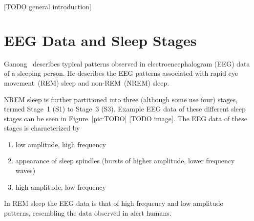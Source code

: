[TODO general introduction]


\section{EEG Data and Sleep Stages}
\label{sec:eeg_data_and_sleep_stages}

Ganong~\cite{Ganong1997} describes typical patterns observed in electroencephalogram (EEG) data of a sleeping person. He describes the EEG patterns associated with rapid eye movement~(REM) sleep and non-REM~(NREM) sleep.

NREM sleep is further partitioned into three (although some use four) stages, termed Stage~1 (S1) to Stage~3 (S3). Example EEG data of these different sleep stages can be seen in Figure~\ref{pic:TODO} [TODO image]. The EEG data of these stages is characterized by

\begin{enumerate}[label={S\arabic*:}]
	\item low amplitude, high frequency
	\item appearance of sleep spindles (bursts of higher amplitude, lower frequency waves)
	\item high amplitude, low frequency
\end{enumerate}

In REM sleep the EEG data is that of high frequency and low amplitude patterns, resembling the data observed in alert humans.


